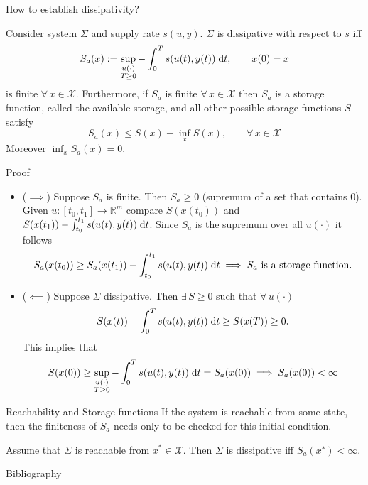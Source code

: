 \documentclass[aspectratio=169]{beamer}
\newcommand{\bbR}{\mathbb{R}}
\begin{document}
\begin{frame}{How to establish dissipativity?}
	
\begin{theorem}
Consider system $\Sigma$ and supply rate $s(u, y)$. $\Sigma$ is dissipative with respect to $s$ iff
\begin{equation*}
	S_a(x):= \sup_{\substack{u(\cdot) \\ T \ge 0}} - \int_0^T s(u(t), y(t)) \d t, \qquad x(0) = x
\end{equation*}
is finite $\forall \, x \in \mathcal{X}$. Furthermore, if $S_a$ is finite $\forall \, x \in \mathcal{X}$ then $S_a$
is a storage function, called the available storage, and all other possible storage functions $S$ satisfy
\begin{equation*}
	S_a(x) \le S(x) - \inf_x S(x), \qquad \forall \,  x \in \mathcal{X}
\end{equation*}
Moreover $\inf_x S_a(x)=0.$
\end{theorem}
	
\end{frame}

\begin{frame}{Proof}

		\begin{itemize}
			\item ($\implies$) Suppose $S_a$ is finite. Then $S_a \ge 0$ (supremum of a set that contains 0). Given $u: [t_0, t_1] \rightarrow \bbR^m$ compare $S(x(t_0))$ and $S(x(t_1)) - \int_{t_0}^{t_1} s(u(t), y(t))\d t$. Since $S_a$ is the supremum over all $u(\cdot)$ it follows
			\begin{equation*}
				S_a(x(t_0)) \ge S_a(x(t_1)) - \int_{t_0}^{t_1} s(u(t), y(t)) \d t \implies S_a \text{ is a storage function.}
			\end{equation*}
			\item ($\impliedby$) Suppose $\Sigma$ dissipative. Then $\exists\,  S \ge 0$ such that $\forall \, u(\cdot)$
			\begin{equation*}
				S(x(t)) + \int_0^T s(u(t), y(t)) \d t \ge S(x(T)) \ge 0.
			\end{equation*}
		This implies that $$S(x(0)) \ge \sup_{\substack{u(\cdot) \\ T \ge 0}} - \int_0^T s(u(t), y(t)) \d t = S_a(x(0)) \implies S_a(x(0)) < \infty$$
		\end{itemize}
\end{frame}

\begin{frame}{Reachability and Storage functions}
If the system is reachable from some state, then the finiteness of $S_a$ needs only to be checked for this initial condition.
\begin{theorem}
	Assume that $\Sigma$ is reachable from $x^* \in \mathcal{X}$. Then $\Sigma$ is dissipative
	iff $S_a (x^∗) < \infty$.
\end{theorem}
\end{frame}




\begin{frame}{Bibliography}
	\nocite{*}
	\printbibliography
\end{frame}
	
	
\end{document}
